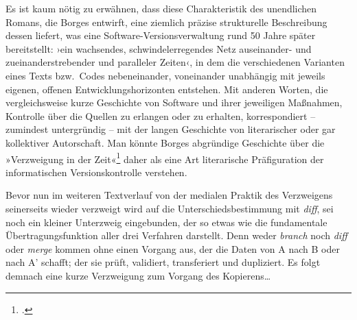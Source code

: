 \documentclass[a4paper,10pt]{article}
\newcommand{\anf}[1]{»#1«}
\newcommand{\inanf}[1]{›#1‹}
\begin{document}
Es ist kaum nötig zu erwähnen, dass diese Charakteristik des unendlichen Romans, die Borges entwirft, eine ziemlich präzise strukturelle Beschreibung dessen liefert, was eine Software-Versionsverwaltung rund 50 Jahre später bereitstellt: \inanf{ein wachsendes, schwindelerregendes Netz auseinander- und zueinanderstrebender und paralleler Zeiten}, in dem die verschiedenen Varianten eines Texts bzw.\  Codes nebeneinander, voneinander unabhängig mit jeweils eigenen, offenen Entwicklungshorizonten entstehen. Mit anderen Worten, die vergleichsweise kurze Geschichte von Software und ihrer jeweiligen Maßnahmen, Kontrolle über die Quellen zu erlangen oder zu erhalten, korrespondiert – zumindest untergründig – mit der langen Geschichte von literarischer oder gar kollektiver Autorschaft. Man könnte Borges abgründige Geschichte über die \anf{Verzweigung in der Zeit}\footcite[169]{borges:1941} daher als eine Art literarische Präfiguration der informatischen Versionskontrolle verstehen. 

Bevor nun im weiteren Textverlauf von der medialen Praktik des Verzweigens seinerseits wieder verzweigt wird auf die Unterschiedsbestimmung mit \emph{diff}, sei noch ein kleiner Unterzweig eingebunden, der so etwas wie die fundamentale Übertragungsfunktion aller drei Verfahren darstellt. Denn weder \emph{branch} noch \emph{diff} oder \emph{merge} kommen ohne einen Vorgang aus, der die Daten von A nach B oder nach A' schafft; der sie prüft, validiert, transferiert und dupliziert. Es folgt demnach eine kurze Verzweigung zum Vorgang des Kopierens\ldots
\end{document}
